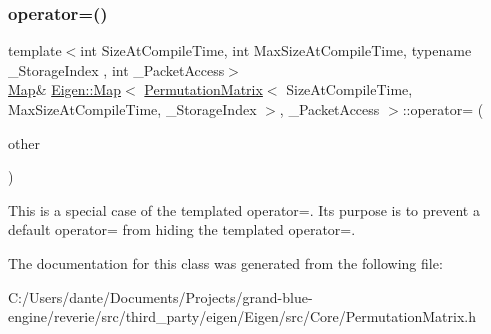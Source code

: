 \subsubsection{\texorpdfstring{operator=()}{operator=()}\hspace{0.1cm}{\footnotesize\ttfamily [3/3]}}
{\footnotesize\ttfamily template$<$int Size\+At\+Compile\+Time, int Max\+Size\+At\+Compile\+Time, typename \+\_\+\+Storage\+Index , int \+\_\+\+Packet\+Access$>$ \\
\mbox{\hyperlink{class_eigen_1_1_map}{Map}}\& \mbox{\hyperlink{class_eigen_1_1_map}{Eigen\+::\+Map}}$<$ \mbox{\hyperlink{class_eigen_1_1_permutation_matrix}{Permutation\+Matrix}}$<$ Size\+At\+Compile\+Time, Max\+Size\+At\+Compile\+Time, \+\_\+\+Storage\+Index $>$, \+\_\+\+Packet\+Access $>$\+::operator= (\begin{DoxyParamCaption}\item[{const \mbox{\hyperlink{class_eigen_1_1_map}{Map}}$<$ \mbox{\hyperlink{class_eigen_1_1_permutation_matrix}{Permutation\+Matrix}}$<$ Size\+At\+Compile\+Time, Max\+Size\+At\+Compile\+Time, \+\_\+\+Storage\+Index $>$, \+\_\+\+Packet\+Access $>$ \&}]{other }\end{DoxyParamCaption})\hspace{0.3cm}{\ttfamily [inline]}}

This is a special case of the templated operator=. Its purpose is to prevent a default operator= from hiding the templated operator=. 

The documentation for this class was generated from the following file\+:\begin{DoxyCompactItemize}
\item 
C\+:/\+Users/dante/\+Documents/\+Projects/grand-\/blue-\/engine/reverie/src/third\+\_\+party/eigen/\+Eigen/src/\+Core/Permutation\+Matrix.\+h\end{DoxyCompactItemize}
